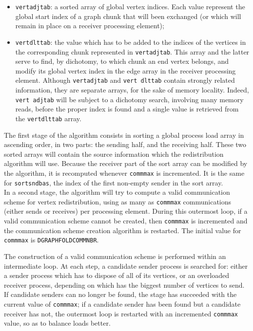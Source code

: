 \begin{itemize}
\texttt{vertadjnbr}: for receiver processes only, the number of
elements in the dichotomy array \texttt{vert\lbt adj\lbt tab};
\item
\texttt{vertadjtab}: a sorted array of global vertex indices. Each
value represent the global start index of a graph chunk that will
been exchanged (or which will remain in place on a receiver processing
element);
\item
\texttt{vertdlttab}: the value which has to be added to the indices
of the vertices in the corresponding chunk represented in
\texttt{vert\lbt adj\lbt tab}. This array and the latter serve to find,
by dichotomy, to which chunk an end vertex belongs, and modify its
global vertex index in the edge array in the receiver processing
element. Although \texttt{vert\lbt adj\lbt tab} and \texttt{vert\lbt
dlt\lbt tab} contain strongly related information, they are separate
arrays, for the sake of memory locality. Indeed, \texttt{vert\lbt
adj\lbt tab} will be subject to a dichotomy search, involving many
memory reads, before the proper index is found and a single value is
retrieved from the \texttt{vert\lbt dlt\lbt tab} array.
\end{itemize}

The first stage of the algorithm consists in sorting a global process
load array in ascending order, in two parts: the sending half, and the
receiving half. These two sorted arrays will contain the source
information which the redistribution algorithm will use. Because the
receiver part of the sort array can be modified by the algorithm, it
is recomputed whenever \texttt{commmax} is incremented. It is the same
for \texttt{sort\lbt snd\lbt bas}, the index of the first non-empty
sender in the sort array.
\\

In a second stage, the algorithm will try to compute a valid
communication scheme for vertex redistribution, using as many as
\texttt{commmax} communications (either sends or receives) per
processing element. During this outermost loop, if a valid
communication scheme cannot be created, then \texttt{commmax} is
incremented and the communication scheme creation algorithm is
restarted. The initial value for \texttt{commmax} is
\texttt{DGRAPH\lbt FOLD\lbt COMM\lbt NBR}.

The construction of a valid communication scheme is performed within
an intermediate loop. At each step, a candidate sender process is
searched for: either a sender process which has to dispose of all of
its vertices, or an overloaded receiver process, depending on which
has the biggest number of vertices to send. If candidate senders can
no longer be found, the stage has succeeded with the current value of
\texttt{commmax}; if a candidate sender has been found but a candidate
receiver has not, the outermost loop is restarted with an incremented
\texttt{commmax} value, so as to balance loads better.

